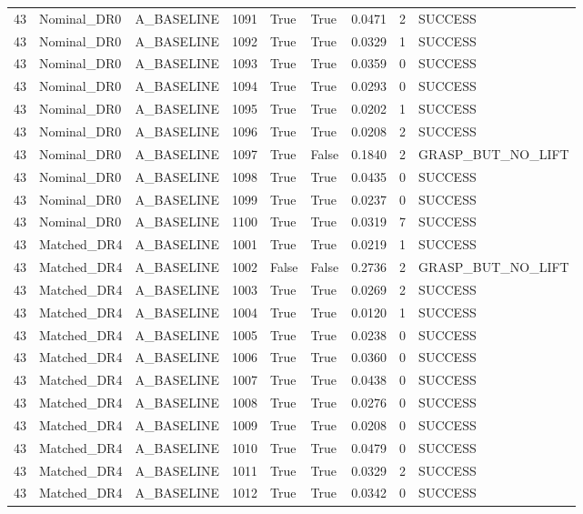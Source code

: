 \documentclass[11pt,a4paper,oneside]{book}
\begin{document}
\begin{longtable}{l l l l l l l l l}
43 & Nominal\_DR0 & A\_BASELINE & 1091 & True & True & 0.0471 & 2 & SUCCESS \\
43 & Nominal\_DR0 & A\_BASELINE & 1092 & True & True & 0.0329 & 1 & SUCCESS \\
43 & Nominal\_DR0 & A\_BASELINE & 1093 & True & True & 0.0359 & 0 & SUCCESS \\
43 & Nominal\_DR0 & A\_BASELINE & 1094 & True & True & 0.0293 & 0 & SUCCESS \\
43 & Nominal\_DR0 & A\_BASELINE & 1095 & True & True & 0.0202 & 1 & SUCCESS \\
43 & Nominal\_DR0 & A\_BASELINE & 1096 & True & True & 0.0208 & 2 & SUCCESS \\
43 & Nominal\_DR0 & A\_BASELINE & 1097 & True & False & 0.1840 & 2 & GRASP\_BUT\_NO\_LIFT \\
43 & Nominal\_DR0 & A\_BASELINE & 1098 & True & True & 0.0435 & 0 & SUCCESS \\
43 & Nominal\_DR0 & A\_BASELINE & 1099 & True & True & 0.0237 & 0 & SUCCESS \\
43 & Nominal\_DR0 & A\_BASELINE & 1100 & True & True & 0.0319 & 7 & SUCCESS \\
43 & Matched\_DR4 & A\_BASELINE & 1001 & True & True & 0.0219 & 1 & SUCCESS \\
43 & Matched\_DR4 & A\_BASELINE & 1002 & False & False & 0.2736 & 2 & GRASP\_BUT\_NO\_LIFT \\
43 & Matched\_DR4 & A\_BASELINE & 1003 & True & True & 0.0269 & 2 & SUCCESS \\
43 & Matched\_DR4 & A\_BASELINE & 1004 & True & True & 0.0120 & 1 & SUCCESS \\
43 & Matched\_DR4 & A\_BASELINE & 1005 & True & True & 0.0238 & 0 & SUCCESS \\
43 & Matched\_DR4 & A\_BASELINE & 1006 & True & True & 0.0360 & 0 & SUCCESS \\
43 & Matched\_DR4 & A\_BASELINE & 1007 & True & True & 0.0438 & 0 & SUCCESS \\
43 & Matched\_DR4 & A\_BASELINE & 1008 & True & True & 0.0276 & 0 & SUCCESS \\
43 & Matched\_DR4 & A\_BASELINE & 1009 & True & True & 0.0208 & 0 & SUCCESS \\
43 & Matched\_DR4 & A\_BASELINE & 1010 & True & True & 0.0479 & 0 & SUCCESS \\
43 & Matched\_DR4 & A\_BASELINE & 1011 & True & True & 0.0329 & 2 & SUCCESS \\
43 & Matched\_DR4 & A\_BASELINE & 1012 & True & True & 0.0342 & 0 & SUCCESS \\

\end{longtable}
\end{document}
